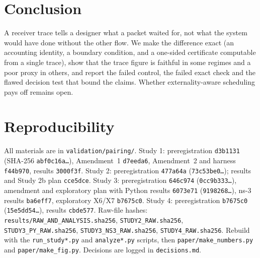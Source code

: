 \documentclass[11pt]{article}
\begin{document}
\section{Conclusion}
A receiver trace tells a designer what a packet waited for, not what the system would have done without the other flow. We make the difference exact (an accounting identity, a boundary condition, and a one-sided certificate computable from a single trace), show that the trace figure is faithful in some regimes and a poor proxy in others, and report the failed control, the failed exact check and the flawed decision test that bound the claims. Whether externality-aware scheduling pays off remains open.

\section*{Reproducibility}\label{sec:repro}
All materials are in \texttt{validation/pairing/}. Study 1: preregistration \texttt{d3b1131} (SHA-256 \texttt{abf0c16a\dots}), Amendment~1 \texttt{d7eeda6}, Amendment~2 and harness \texttt{f44b970}, results \texttt{3000f3f}. Study 2: preregistration \texttt{477a64a} (\texttt{73c53be0\dots}); results and Study 2b plan \texttt{cce5dce}. Study 3: preregistration \texttt{646c974} (\texttt{0cc9b333\dots}), amendment and exploratory plan with Python results \texttt{6073e71} (\texttt{9198268\dots}), ns-3 results \texttt{ba6eff7}, exploratory X6/X7 \texttt{b7675c0}. Study 4: preregistration \texttt{b7675c0} (\texttt{15e5dd54\dots}), results \texttt{cbde577}. Raw-file hashes: \texttt{results/RAW\_AND\_ANALYSIS.sha256}, \texttt{STUDY2\_RAW.sha256}, \texttt{STUDY3\_PY\_RAW.sha256}, \texttt{STUDY3\_NS3\_RAW.sha256}, \texttt{STUDY4\_RAW.sha256}. Rebuild with the \texttt{run\_study*.py} and \texttt{analyze*.py} scripts, then \texttt{paper/make\_numbers.py} and \texttt{paper/make\_fig.py}. Decisions are logged in \texttt{decisions.md}.



\end{document}
